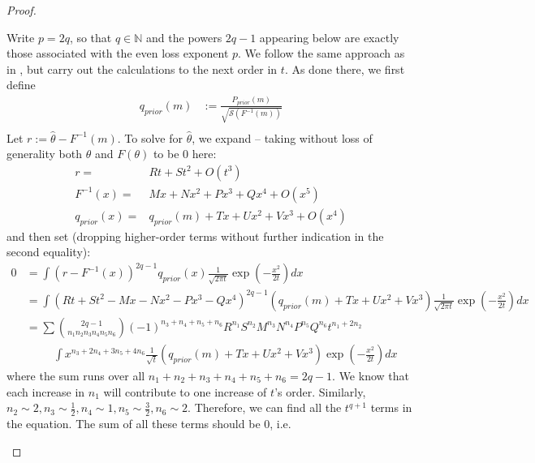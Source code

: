 \begin{proof}
\begin{itemize}
    Write \(p=2q\), so that \(q\in\mathbb{N}\) and the powers \(2q-1\) appearing below are exactly those associated with the even loss exponent \(p\).
    We follow the same approach as in \citet{hahn2024unifying}, but carry out the calculations to the next order in $t$.
    As done there, we first define
    \begin{align*}
        q_{prior}(m) &:= \frac{P_{prior}(m)}{\sqrt{\mathcal{S}(F^{-1}(m))}} \\
    \end{align*} 
    Let $r := \widehat{\theta} - F^{-1}(m)$.
    To solve for $\widehat{\theta}$, we expand -- taking without loss of generality both $\theta$ and  $F(\theta)$ to be $0$ here:
\begin{align*}
r=&Rt+St^2+O(t^3) \\
F^{-1}(x)=& Mx + Nx^2 +Px^3 + Qx^4 + O(x^5) \\
q_{prior}(x) =& q_{prior}(m) + Tx + Ux^2 + Vx^3 + O(x^4)
\end{align*}
and then set (dropping higher-order terms without further indication in the second equality):
\begin{align*}
    0 &= \int (r - F^{-1}(x))^{2q-1} q_{prior}(x) \frac{1}{\sqrt{2\pi t}}\exp (-\frac{x^2}{2t})dx\\ 
    &= \int (Rt+St^2-Mx -Nx^2-Px^3-Qx^4)^{2q-1} \left( q_{prior}(m) + Tx + Ux^2+Vx^3 \right) \frac{1}{\sqrt{2\pi t}}\exp (-\frac{x^2}{2t})dx\\
    &= \sum \binom{2q-1}{n_1n_2n_3n_4n_5n_6} (-1)^{n_3+n_4+n_5+n_6} R^{n_1}S^{n_2}M^{n_3}N^{n_4}P^{n_5}Q^{n_6}t^{n_1+2n_2} \\
&\ \ \ \ \ \ \  \ \ \ \ \int x^{n_3+2n_4+3n_5+4n_6}\frac{1}{\sqrt{t}}
    \left( q_{prior}(m) + Tx + Ux^2+Vx^3 \right)\exp (-\frac{x^2}{2t})dx
\end{align*}
where the sum runs over all $n_1+n_2+n_3+n_4+n_5+n_6=2q-1$.
%
%
We know that each increase in $n_1$ will contribute to one increase of $t$'s order. Similarly, $n_2 \sim 2, n_3 \sim \frac{1}{2}, n_4 \sim 1, n_5 \sim \frac{3}{2}, n_6 \sim 2$. Therefore, we can find all the $t^{q+1}$ terms in the equation. The sum of all these terms should be 0, i.e.

\end{itemize}
\end{proof}
